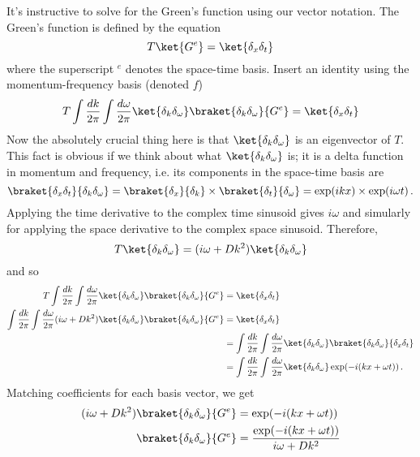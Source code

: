 It's instructive to solve for the Green's function using our vector notation.
The Green's function is defined by the equation
\begin{equation*}
  T \ket{G^e} = \ket{\delta_x \delta_t}
\end{equation*}
where the superscript $^e$ denotes the space-time basis.
Insert an identity using the momentum-frequency basis (denoted $f$)
\begin{equation*}
  T \int \frac{dk}{2\pi}\int \frac{d\omega}{2\pi} \ket{\delta_k \delta_\omega}
  \braket{\delta_k \delta_\omega}{G^e} = \ket{\delta_x \delta_t}
\end{equation*}
Now the absolutely crucial thing here is that $\ket{\delta_k \delta_\omega}$ is an eigenvector of $T$.
This fact is obvious if we think about what $\ket{\delta_k \delta_\omega}$ is; it is a delta function in momentum and frequency, i.e. its components in the space-time basis are
\begin{equation*}
  \braket{\delta_x \delta_t}{\delta_k \delta_\omega}
  = \braket{\delta_x}{\delta_k} \times \braket{\delta_t}{\delta_\omega}
  = \exp ( i k x) \times \exp( i \omega t) \, .
\end{equation*}
Applying the time derivative to the complex time sinusoid gives $i \omega$ and simularly for applying the space derivative to the complex space sinusoid.
Therefore,
\begin{equation*}
  T \ket{\delta_k \delta_\omega} = (i\omega + D k^2) \ket{\delta_k \delta_\omega}
\end{equation*}
and so
\begin{align*}
  T \int \frac{dk}{2\pi}\int \frac{d\omega}{2\pi} \ket{\delta_k \delta_\omega}
  \braket{\delta_k \delta_\omega}{G^e}
  & = \ket{\delta_x \delta_t} \\
  \int \frac{dk}{2\pi} \int \frac{d\omega}{2\pi} (i\omega + D k^2) \ket{\delta_k \delta_\omega} \braket{\delta_k \delta_\omega}{G^e}
  &= \ket{\delta_x \delta_t} \\
  &= \int \frac{dk}{2\pi} \int \frac{d\omega}{2\pi} \ket{\delta_k \delta_\omega} \braket{\delta_k \delta_\omega}{\delta_x \delta_t} \\
  &= \int \frac{dk}{2\pi} \int \frac{d\omega}{2\pi} \ket{\delta_k \delta_\omega} \exp (-i(kx + \omega t))
  \, .
\end{align*}
Matching coefficients for each basis vector, we get
\begin{align*}
  (i \omega + D k^2) \braket{\delta_k\delta_\omega}{G^e}
  &= \exp(-i(kx + \omega t)) \\
  \braket{\delta_k\delta_\omega}{G^e}
  &= \frac{\exp(-i(kx + \omega t))}{i \omega + D k^2} \\
\end{align*}
